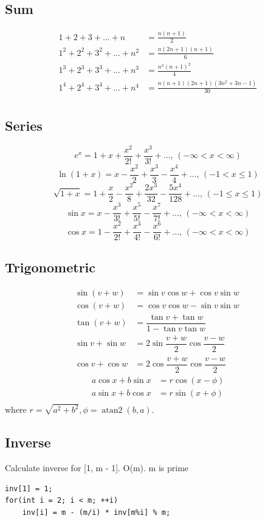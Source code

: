 \documentclass[A4 paper, 12pt, oneside, landscape]{article}
\begin{document}
\begin{multicols}{2}
	\subsection{Sum}
	\begin{align*}
    	1 + 2 + 3 + \dots + n &= \frac{n(n+1)}{2} \\
    	1^2 + 2^2 + 3^2 + \dots + n^2 &= \frac{n(2n+1)(n+1)}{6} \\
    	1^3 + 2^3 + 3^3 + \dots + n^3 &= \frac{n^2(n+1)^2}{4} \\
    	1^4 + 2^4 + 3^4 + \dots + n^4 &= \frac{n(n+1)(2n+1)(3n^2 + 3n - 1)}{30} \\
    \end{align*}
    
    \subsection{Series}
    $$e^x = 1+x+\frac{x^2}{2!}+\frac{x^3}{3!}+\dots,\,(-\infty<x<\infty)$$
    $$\ln(1+x) = x-\frac{x^2}{2}+\frac{x^3}{3}-\frac{x^4}{4}+\dots,\,(-1<x\leq1)$$
    $$\sqrt{1+x} = 1+\frac{x}{2}-\frac{x^2}{8}+\frac{2x^3}{32}-\frac{5x^4}{128}+\dots,\,(-1\leq x\leq1)$$
    $$\sin x = x-\frac{x^3}{3!}+\frac{x^5}{5!}-\frac{x^7}{7!}+\dots,\,(-\infty<x<\infty)$$
    $$\cos x = 1-\frac{x^2}{2!}+\frac{x^4}{4!}-\frac{x^6}{6!}+\dots,\,(-\infty<x<\infty)$$
    
    \subsection{Trigonometric}
    \begin{align*}
        \sin(v+w)&= \sin v\cos w+\cos v\sin w \\
        \cos(v+w)&=\cos v\cos w-\sin v\sin w\ \\
        \tan(v+w)&=\dfrac{\tan v+\tan w}{1-\tan v\tan w} \\
        \sin v+\sin w&=2\sin\dfrac{v+w}{2}\cos\dfrac{v-w}{2} \\
        \cos v+\cos w&=2\cos\dfrac{v+w}{2}\cos\dfrac{v-w}{2} 
    \end{align*}
    \begin{align*}
        a\cos x+b\sin x&=r\cos(x-\phi)\\
        a\sin x+b\cos x&=r\sin(x+\phi)\\
    \end{align*}
    where $r=\sqrt{a^2+b^2}, \phi=\operatorname{atan2}(b,a)$.

    \subsection{Inverse}
    Calculate inverse for [1, m - 1]. O(m). m is prime
    \begin{lstlisting}
inv[1] = 1;
for(int i = 2; i < m; ++i)
    inv[i] = m - (m/i) * inv[m%i] % m;
    \end{lstlisting}
    

\end{multicols}
\end{document}
